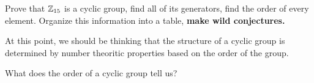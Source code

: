 \documentclass{ximera}
\begin{document}
\begin{exercise}
  Prove that $\mathbb Z_{15}$ is a cyclic group, find all of its generators,
  find the order of every element. Organize this information into a
  table, \textbf{make wild conjectures.}
\end{exercise}


At this point, we should be thinking that the structure of a cyclic
group is determined by number theoritic properties based on the order
of the group.


\begin{question}
  What does the order of a cyclic group tell us?
\end{question}
\end{document}
